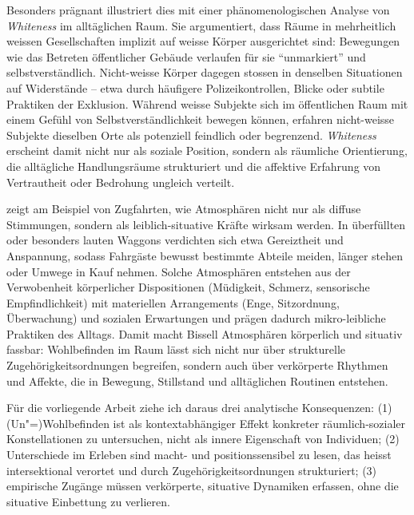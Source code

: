 Besonders prägnant illustriert dies \textcite{ahmedPhenomenologyWhiteness2007} mit einer phänomenologischen Analyse von \emph{Whiteness} im alltäglichen Raum. Sie argumentiert, dass Räume in mehrheitlich weissen Gesellschaften implizit auf weisse Körper ausgerichtet sind: Bewegungen wie das Betreten öffentlicher Gebäude verlaufen für sie \enquote{unmarkiert} und selbstverständlich. Nicht-weisse Körper dagegen stossen in denselben Situationen auf Widerstände -- etwa durch häufigere Polizeikontrollen, Blicke oder subtile Praktiken der Exklusion. Während weisse Subjekte sich im öffentlichen Raum mit einem Gefühl von Selbstverständlichkeit bewegen können, erfahren nicht-weisse Subjekte dieselben Orte als potenziell feindlich oder begrenzend. \emph{Whiteness} erscheint damit nicht nur als soziale Position, sondern als räumliche Orientierung, die alltägliche Handlungsräume strukturiert und die affektive Erfahrung von Vertrautheit oder Bedrohung ungleich verteilt.

\textcite{bissellPassengerMobilitiesAffective2010} zeigt am Beispiel von Zugfahrten, wie Atmosphären nicht nur als diffuse Stimmungen, sondern als leiblich-situative Kräfte wirksam werden. In überfüllten oder besonders lauten Waggons verdichten sich etwa Gereiztheit und Anspannung, sodass Fahrgäste bewusst bestimmte Abteile meiden, länger stehen oder Umwege in Kauf nehmen. Solche Atmosphären entstehen aus der Verwobenheit körperlicher Dispositionen (Müdigkeit, Schmerz, sensorische Empfindlichkeit) mit materiellen Arrangements (Enge, Sitzordnung, Überwachung) und sozialen Erwartungen und prägen dadurch mikro-leibliche Praktiken des Alltags. Damit macht Bissell Atmosphären körperlich und situativ fassbar: Wohlbefinden im Raum lässt sich nicht nur über strukturelle Zugehörigkeitsordnungen begreifen, sondern auch über verkörperte Rhythmen und Affekte, die in Bewegung, Stillstand und alltäglichen Routinen entstehen.

Für die vorliegende Arbeit ziehe ich daraus drei analytische Konsequenzen: (1) (Un\nobreakdash"=)Wohlbefinden ist als kontextabhängiger Effekt konkreter räumlich-sozialer Konstellationen zu untersuchen, nicht als innere Eigenschaft von Individuen; (2) Unterschiede im Erleben sind macht- und positionssensibel zu lesen, das heisst intersektional verortet und durch Zugehörigkeitsordnungen strukturiert; (3) empirische Zugänge müssen verkörperte, situative Dynamiken erfassen, ohne die situative Einbettung zu verlieren.

\vspace{1em}

